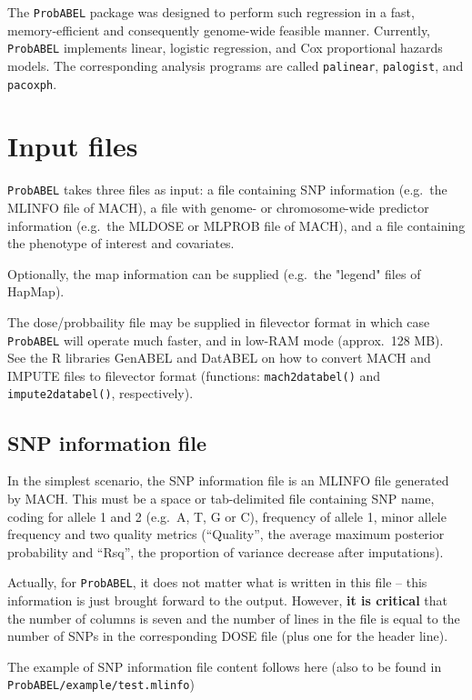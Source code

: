 \documentclass[12pt,a4paper]{article}
\begin{document}
The \texttt{ProbABEL} package was designed to perform such regression
in a fast, memory-efficient and consequently genome-wide feasible manner.
Currently, \texttt{ProbABEL} implements linear, logistic regression,
and Cox proportional hazards models. The corresponding analysis
programs are called \texttt{palinear},  \texttt{palogist},
and \texttt{pacoxph}.


\section{Input files}
\texttt{ProbABEL} takes three files as input: a file containing SNP
information (e.g.~the MLINFO file of MACH), a file with genome- or
chromosome-wide predictor information (e.g.~the MLDOSE or MLPROB file of MACH),
and a file containing the phenotype of interest and covariates.

Optionally, the map information can be supplied (e.g.~the "legend"
files of HapMap).

The dose/probbaility file may be supplied in filevector format
in which case \texttt{ProbABEL} will operate much faster, and
in low-RAM mode (approx.~128 MB). See the R libraries GenABEL and
DatABEL on how to convert MACH and IMPUTE files to
filevector format (functions: \texttt{mach2databel()} and
\texttt{impute2databel()}, respectively).

\subsection{SNP information file}
\label{ssec:infoin}
In the simplest scenario, the SNP information file is an MLINFO
file generated by MACH. This must be a space or tab-delimited file
containing SNP name, coding for allele 1 and 2 (e.g.~A, T, G or C),
frequency of allele 1, minor allele frequency and two quality
metrics (``Quality'', the average maximum posterior probability and
``Rsq'', the proportion of variance decrease after imputations).

Actually,
for \texttt{ProbABEL}, it does not matter what is written in this file --
this information is just brought forward to the output. However,
\textbf{it is critical} that the number of columns is seven and the number
of lines in the file is equal to the number of SNPs in the
corresponding DOSE file (plus one for the header line).

The example of SNP information file content follows here (also
to be found in \texttt{ProbABEL/example/test.mlinfo})


\end{document}

